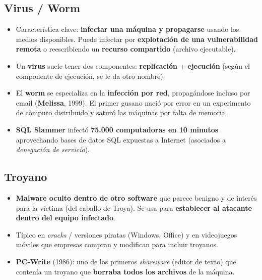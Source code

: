 \documentclass[11pt,a4paper]{article}
\begin{document}
\subsection{Virus / Worm}
\begin{itemize}[leftmargin=1.4em,itemsep=1pt]
  \item Característica clave: \textbf{infectar una máquina y propagarse} usando los medios
        disponibles. Puede infectar por \textbf{explotación de una vulnerabilidad remota} o
        reescribiendo un \textbf{recurso compartido} (archivo ejecutable).
  \item Un \textbf{virus} suele tener dos componentes: \textbf{replicación} + \textbf{ejecución}
        (según el componente de ejecución, se le da otro nombre).
  \item El \textbf{worm} se especializa en la \textbf{infección por red}, propagándose incluso
        por email (\textbf{Melissa}, 1999). El primer gusano nació por error en un experimento de
        cómputo distribuido y saturó las máquinas por falta de memoria.
  \item \textbf{SQL Slammer} infectó \textbf{75.000 computadoras en 10 minutos} aprovechando bases
        de datos SQL expuestas a Internet (asociados a \emph{denegación de servicio}).
\end{itemize}

\subsection{Troyano}
\begin{itemize}[leftmargin=1.4em,itemsep=1pt]
  \item \textbf{Malware oculto dentro de otro software} que parece benigno y de interés para la
        víctima (del caballo de Troya). Se usa para \textbf{establecer al atacante dentro del
        equipo infectado}.
  \item Típico en \emph{cracks} / versiones piratas (Windows, Office) y en videojuegos móviles
        que empresas compran y modifican para incluir troyanos.
  \item \textbf{PC-Write} (1986): uno de los primeros \emph{shareware} (editor de texto) que
        contenía un troyano que \textbf{borraba todos los archivos} de la máquina.
\end{itemize}
\end{document}
